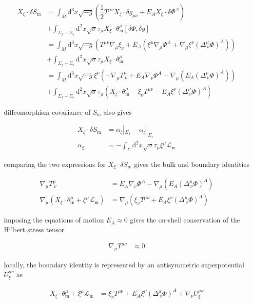 \begin{align}
X_{\xi}\cdot \delta S_{\mathrm{m}} & =\int _{M}\mathrm{d}^{3}x\sqrt{ -g }\left(\dfrac{1}{2}T^{\mu \nu}X_{\xi}\cdot \delta g_{\mu \nu}+E_{A}X_{\xi}\cdot \delta \Phi ^{A}\right) \\
 & +\int _{\Sigma _{f}-\Sigma _{i}}\mathrm{d}^{2}x\sqrt{ \sigma }\tau _{\mu}X_{\xi}\cdot \theta ^{\mu}_{\mathrm{m}}[\delta \Phi,\delta g] \\
 & =\int _{M}\mathrm{d}^{3}x\sqrt{ -g }\left(T^{\mu \nu}\nabla _{\mu}\xi _{\nu}+E_{A}(\xi ^{\mu}\nabla _{\mu}\Phi ^{A}+\nabla _{\mu}\xi ^{\nu}(\Delta ^{\mu}_{~\nu}\Phi)^{A})\right) \\
 & +\int _{\Sigma _{f}-\Sigma _{i}}\mathrm{d}^{2}x\sqrt{ \sigma }\tau _{\mu}X_{\xi}\cdot \theta ^{\mu}_{\mathrm{m}} \\
 & =\int _{M}\mathrm{d}^{3}x\sqrt{ -g }\xi ^{\nu}\left(-\nabla _{\mu}T^{\mu}_{~\nu}+E_{A}\nabla _{\nu}\Phi ^{A}-\nabla _{\mu}(E_{A}(\Delta ^{\mu}_{~\nu}\Phi)^{A})\right) \\
 & +\int _{\Sigma _{f}-\Sigma _{i}}\mathrm{d}^{2}x\sqrt{ \sigma }\tau _{\mu}(X_{\xi}\cdot \theta _{\mathrm{m}}^{\mu}-\xi _{\nu}T^{\mu \nu}-E_{A}\xi ^{\nu}(\Delta ^{\mu}_{~\nu}\Phi)^{A})
\end{align}

diffeomorphism covariance of $\displaystyle{S_{\mathrm{m}}}$ also gives

\begin{align}
X_{\xi}\cdot \delta S_{\mathrm{m}} & =\alpha _{\xi}|_{\Sigma _{f}}-\alpha _{\xi}|_{\Sigma _{i}} \\
\alpha _{\xi} & =-\int _{\Sigma}\mathrm{d}^{2}x\sqrt{ \sigma }\tau _{\mu}\xi ^{\mu}\mathcal{L}_{\mathrm{m}}
\end{align}

comparing the two expressions for $\displaystyle{X_{\xi}\cdot \delta S_{\mathrm{m}}}$ gives the bulk and boundary identities

\begin{align}
\nabla _{\mu}T^{\mu}_{~\nu} & =E_{A}\nabla _{\nu}\Phi ^{A}-\nabla _{\mu}(E_{A}(\Delta ^{\mu}_{~\nu}\Phi)^{A}) \\
\nabla _{\mu}\left(X_{\xi}\cdot \theta ^{\mu}_{\mathrm{m}}+\xi ^{\mu}\mathcal{L}_{\mathrm{m}}\right) & =\nabla _{\mu}\left(\xi _{\nu}T^{\mu \nu}+E_{A}\xi ^{\nu}(\Delta ^{\mu}_{~\nu}\Phi)^{A}\right)
\end{align}

imposing the equations of motion $\displaystyle{E_{A}\approx 0}$ gives the on-shell conservation of the Hilbert stress tensor

\begin{align}
\nabla _{\mu}T^{\mu \nu} & \approx 0
\end{align}

locally, the boundary identity is represented by an antisymmetric superpotential $\displaystyle{U_{\xi}^{\mu \nu}}$ as

\begin{align}
X_{\xi}\cdot \theta ^{\mu}_{\mathrm{m}}+\xi ^{\mu}\mathcal{L}_{\mathrm{m}} & =\xi _{\nu}T^{\mu \nu}+E_{A}\xi ^{\nu}(\Delta ^{\mu}_{~\nu}\Phi)^{A}+\nabla _{\nu}U_{\xi}^{\mu \nu}
\end{align}
